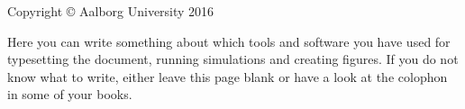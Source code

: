 \thispagestyle{empty}
{
	\small
	\strut\vfill %
	\noindent Copyright \copyright{} Aalborg University 2016\par
	\vspace{0.2cm}
	\noindent Here you can write something about which tools and software you have used for typesetting the document,
	running simulations and creating figures. If you do not know what to write,
	either leave this page blank or have a look at the colophon in some of your books.
}
\clearpage
